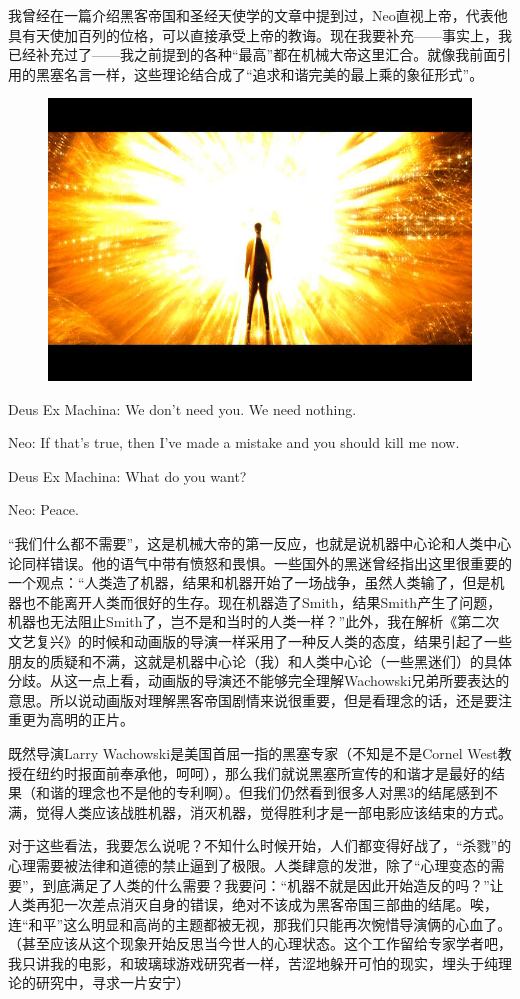 \documentclass[UTF8]{ctexart}
\newenvironment{myquote}{\color{green} \setlength{\leftskip}{6em} \setlength{\rightskip}{4em} \setlength{\parindent}{-2em}}{\par}
\begin{document}
我曾经在一篇介绍黑客帝国和圣经天使学的文章中提到过，Neo直视上帝，代表他具有天使加百列的位格，可以直接承受上帝的教诲。现在我要补充——事实上，我已经补充过了——我之前提到的各种“最高”都在机械大帝这里汇合。就像我前面引用的黑塞名言一样，这些理论结合成了“追求和谐完美的最上乘的象征形式”。

\begin{figure}[htb]
\centering
\includegraphics[width=0.5\linewidth]{fig/2679b15192689319367abeb1.jpg}
\end{figure}

\begin{myquote}
Deus Ex Machina: We don't need you. We need nothing.

Neo: If that's true, then I've made a mistake and you should kill me now.

Deus Ex Machina: What do you want?

Neo: Peace.
\end{myquote}

“我们什么都不需要”，这是机械大帝的第一反应，也就是说机器中心论和人类中心论同样错误。他的语气中带有愤怒和畏惧。一些国外的黑迷曾经指出这里很重要的一个观点：“人类造了机器，结果和机器开始了一场战争，虽然人类输了，但是机器也不能离开人类而很好的生存。现在机器造了Smith，结果Smith产生了问题，机器也无法阻止Smith了，岂不是和当时的人类一样？”此外，我在解析《第二次文艺复兴》的时候和动画版的导演一样采用了一种反人类的态度，结果引起了一些朋友的质疑和不满，这就是机器中心论（我）和人类中心论（一些黑迷们）的具体分歧。从这一点上看，动画版的导演还不能够完全理解Wachowski兄弟所要表达的意思。所以说动画版对理解黑客帝国剧情来说很重要，但是看理念的话，还是要注重更为高明的正片。

既然导演Larry Wachowski是美国首屈一指的黑塞专家（不知是不是Cornel West教授在纽约时报面前奉承他，呵呵），那么我们就说黑塞所宣传的和谐才是最好的结果（和谐的理念也不是他的专利啊）。但我们仍然看到很多人对黑3的结尾感到不满，觉得人类应该战胜机器，消灭机器，觉得胜利才是一部电影应该结束的方式。

对于这些看法，我要怎么说呢？不知什么时候开始，人们都变得好战了，“杀戮”的心理需要被法律和道德的禁止逼到了极限。人类肆意的发泄，除了“心理变态的需要”，到底满足了人类的什么需要？我要问：“机器不就是因此开始造反的吗？”让人类再犯一次差点消灭自身的错误，绝对不该成为黑客帝国三部曲的结尾。唉，连“和平”这么明显和高尚的主题都被无视，那我们只能再次惋惜导演俩的心血了。（甚至应该从这个现象开始反思当今世人的心理状态。这个工作留给专家学者吧，我只讲我的电影，和玻璃球游戏研究者一样，苦涩地躲开可怕的现实，埋头于纯理论的研究中，寻求一片安宁）
\end{document}
